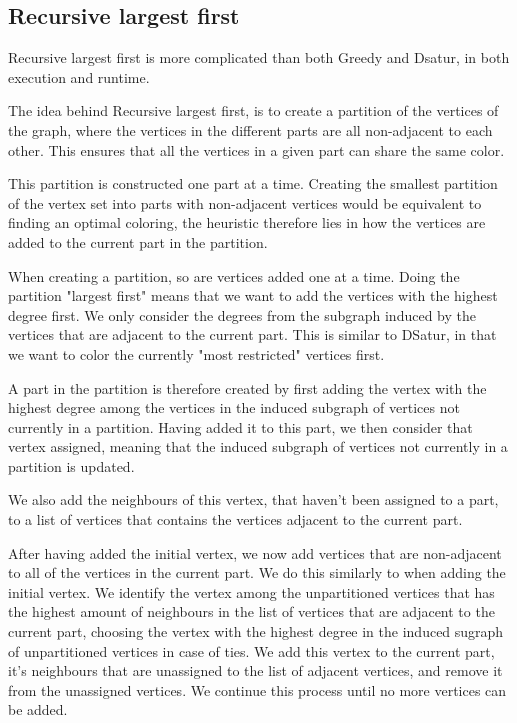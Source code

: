 \documentclass[a4paper]{article}
\begin{document}
\subsection{Recursive largest first}

Recursive largest first is more complicated than both Greedy and Dsatur, in both
execution and runtime. 

The idea behind Recursive largest first, is to create a partition of the
vertices of the graph, where the vertices in the different parts are all
non-adjacent to each other. This ensures that all the vertices in a given part
can share the same color. 

This partition is constructed one part at a time. Creating the smallest partition of the
vertex set into parts with non-adjacent vertices would be equivalent to finding
an optimal coloring, the heuristic therefore lies in how the vertices are added 
to the current part in the partition.

When creating a partition, so are vertices added one at a time. Doing the
partition "largest first" means that we want to add the vertices with the
highest degree first. We only consider the degrees from the subgraph induced by
the vertices that are adjacent to the current part. This is similar to DSatur,
in that we want to color the currently "most restricted" vertices first.

A part in the partition is therefore created by first adding the vertex with the highest
degree among the vertices in the induced subgraph of vertices not currently in a
partition. Having added it to this part, we then consider that vertex
assigned, meaning that the induced subgraph of vertices not
currently in a partition is updated. 

We also add the neighbours of this vertex, that haven't been assigned to a
part, to a list of vertices that contains the vertices adjacent to the current
part.  

After having added the initial vertex, we now add vertices that are
non-adjacent to all of the vertices in the current part. We do this similarly
to when adding the initial vertex. We identify the vertex among the
unpartitioned vertices that has the highest amount of neighbours in the list of
vertices that are adjacent to the current part, choosing the vertex with the
highest degree in the induced sugraph of unpartitioned vertices in case of
ties.  We add this vertex to the current part, it's neighbours that are
unassigned to the list of adjacent vertices, and remove it from the unassigned
vertices. We continue this process until no more vertices can be added.
\end{document}
